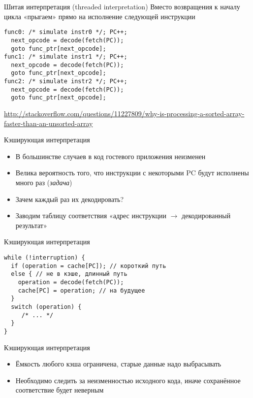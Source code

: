 \begin{frame}[fragile]{Шитая интерпретация (threaded interpretation)}
Вместо возвращения к началу цикла «прыгаем» прямо на исполнение следующей инструкции
\begin{verbatim}
func0: /* simulate instr0 */; PC++;
  next_opcode = decode(fetch(PC));
  goto func_ptr[next_opcode];
func1: /* simulate instr1 */; PC++;
  next_opcode = decode(fetch(PC));
  goto func_ptr[next_opcode];
func2: /* simulate instr2 */; PC++;
  next_opcode = decode(fetch(PC));
  goto func_ptr[next_opcode];
\end{verbatim}

\tiny\url{http://stackoverflow.com/questions/11227809/why-is-processing-a-sorted-array-faster-than-an-unsorted-array}
\end{frame}

\begin{frame}{Кэширующая интерпретация}
\begin{itemize}
\item В большинстве случаев в код гостевого приложения неизменен
\item Велика вероятность того, что инструкции с некоторыми PC будут исполнены много раз (\textit{задача})
\item Зачем каждый раз их декодировать?
\item Заводим таблицу соответствия «адрес инструкции $\rightarrow$ декодированный результат» 
\end{itemize}

\end{frame}

\begin{frame}[fragile]{Кэширующая интерпретация}
\begin{verbatim}
while (!interruption) {
  if (operation = cache[PC]); // короткий путь
  else { // не в кэше, длинный путь
  	operation = decode(fetch(PC));
  	cache[PC] = operation; // на будущее
  }
  switch (operation) {
     /* ... */
  }
}
\end{verbatim}


\end{frame}

\begin{frame}{Кэширующая интерпретация}
\begin{itemize}
\item Ёмкость любого кэша ограничена, старые данные надо выбрасывать
\item Необходимо следить за неизменностью исходного кода, иначе сохранённое соответствие будет неверным
\end{itemize}
\end{frame}

